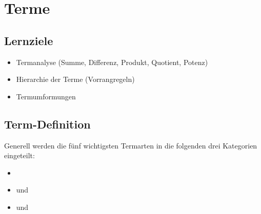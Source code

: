 
\section{Terme}

\subsection*{Lernziele}

\begin{itemize}
 \item Termanalyse (Summe, Differenz, Produkt, Quotient, Potenz)
 \item Hierarchie der Terme (Vorrangregeln)
 \item Termumformungen
\end{itemize}


\newpage

\subsection{Term-Definition}


Generell werden die fünf wichtigsten Termarten in die folgenden drei Kategorien eingeteilt:
\begin{itemize}
\item {}
\item {} und 
\item {} und 
\end{itemize}


